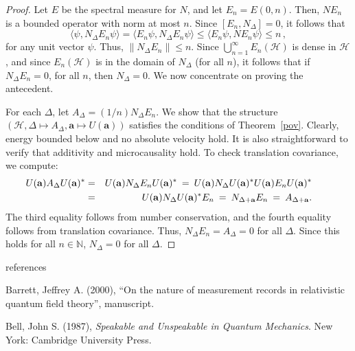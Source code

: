 \documentclass[12pt]{article}
\theoremstyle{remark}
\newcommand{\norm}[1]{\mbox{$\| #1\|$}}
\newcommand{\hil}[1]{\mathcal{#1}}
\begin{document}
\begin{appendix}
\begin{proof}
  Let $E$ be the spectral measure for $N$, and let $E_{n}=E(0,n)$.
  Then, $NE_{n}$ is a bounded operator with norm at most $n$.  Since
  $[E_{n},N_{\Delta}]=0$, it follows that \begin{equation} \langle
    \psi ,N_{\Delta}E_{n}\psi \rangle = \langle E_{n}\psi
    ,N_{\Delta}E_{n}\psi \rangle \leq \langle E_{n}\psi ,NE_{n}\psi
    \rangle \leq n \, ,\end{equation} for any unit vector $\psi$.
  Thus, $\norm{N_{\Delta}E_{n}}\leq n$.  Since $\bigcup
  _{n=1}^{\infty}E_{n}(\hil{H})$ is dense in $\hil{H}$, and since
  $E_{n}(\hil{H})$ is in the domain of $N_{\Delta}$ (for all $n$), it
  follows that if $N_{\Delta}E_{n}=0$, for all $n$, then
  $N_{\Delta}=0$.  We now concentrate on proving the antecedent.
  
  For each $\Delta$, let $A_{\Delta}=(1/n)N_{\Delta}E_{n}$.  We show
  that the structure $(\hil{H},\Delta \mapsto
  A_{\Delta},\mathbf{a}\mapsto U(\mathbf{a}))$ satisfies the
  conditions of Theorem~\ref{pov}.  Clearly, energy bounded below and
  no absolute velocity hold.  It is also straightforward to verify
  that additivity and microcausality hold.  To check translation
  covariance, we compute:
\begin{eqnarray}
\hspace{-2em} U(\mathbf{a})A_{\Delta}U(\mathbf{a})^{*} &=&
U(\mathbf{a})N_{\Delta}E_{n}U(\mathbf{a})^{*} \:=\: 
U(\mathbf{a})N_{\Delta}U(\mathbf{a})^{*}U(\mathbf{a})E_{n}U(\mathbf{a})^{*}
\\
&=& U(\mathbf{a})N_{\Delta}U(\mathbf{a})^{*}E_{n} \:=\: N_{\Delta
  +\mathbf{a}}E_{n} 
\:=\: A_{\Delta +\mathbf{a}}. \end{eqnarray}  
The third equality follows from number conservation, and the
fourth equality follows from translation covariance.
Thus, $N_{\Delta}E_{n}=A_{\Delta}=0$ for all $\Delta$.  Since this
holds for all $n\in \mathbb{N}$, $N_{\Delta}=0$ for
all $\Delta$.  \end{proof}

\end{appendix}

\newpage
\begin{center} {\sc references } \end{center}

Barrett, Jeffrey A. (2000), ``On the nature of
measurement records in relativistic quantum field theory'',
manuscript.

Bell, John S. (1987), {\it Speakable and Unspeakable in Quantum
  Mechanics}.  New York: Cambridge University Press.
\end{document}
